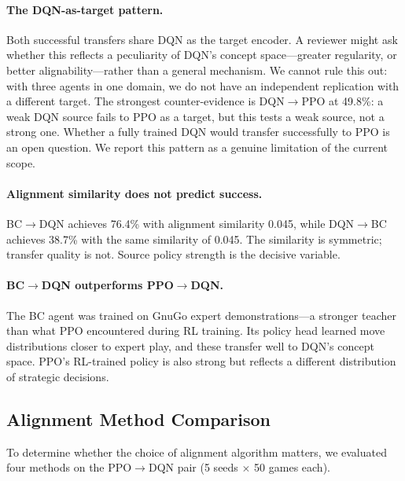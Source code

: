 \documentclass[11pt,a4paper]{article}
\begin{document}
\paragraph{The DQN-as-target pattern.} Both successful transfers share DQN as the target encoder. A reviewer might ask whether this reflects a peculiarity of DQN's concept space---greater regularity, or better alignability---rather than a general mechanism. We cannot rule this out: with three agents in one domain, we do not have an independent replication with a different target. The strongest counter-evidence is DQN$\to$PPO at 49.8\%: a weak DQN source fails to PPO as a target, but this tests a weak source, not a strong one. Whether a fully trained DQN would transfer successfully to PPO is an open question. We report this pattern as a genuine limitation of the current scope.

\paragraph{Alignment similarity does not predict success.} BC$\to$DQN achieves 76.4\% with alignment similarity 0.045, while DQN$\to$BC achieves 38.7\% with the same similarity of 0.045. The similarity is symmetric; transfer quality is not. Source policy strength is the decisive variable.

\paragraph{BC$\to$DQN outperforms PPO$\to$DQN.} The BC agent was trained on GnuGo expert demonstrations---a stronger teacher than what PPO encountered during RL training. Its policy head learned move distributions closer to expert play, and these transfer well to DQN's concept space. PPO's RL-trained policy is also strong but reflects a different distribution of strategic decisions.

\subsection{Alignment Method Comparison}
\label{sec:alignment_comparison}

To determine whether the choice of alignment algorithm matters, we evaluated four methods on the PPO$\to$DQN pair (5 seeds $\times$ 50 games each).
\end{document}
